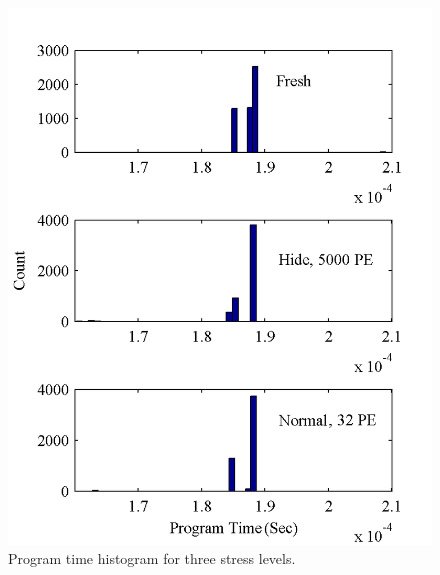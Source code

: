 \begin{figure} 
\begin{center} 
\includegraphics[width=\mywidth]{figs/programtime_hist.png} 
\caption{Program time histogram for three stress levels.}
\label{fig:ptime_histo} 
\vspace{-0.1in}
\end{center} 
\end{figure}





